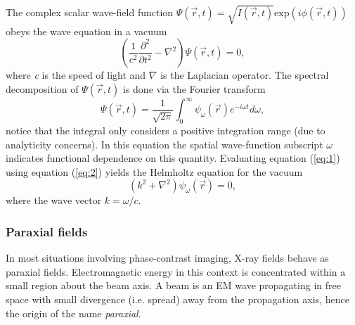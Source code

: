 \documentclass[9pt, a4paper]{article}
\begin{document}
The complex scalar wave-field function $\Psi(\vec{r},t) = \sqrt{I(\vec{r},t)} \mathrm{exp}(i \phi(\vec{r},t))$ obeys the wave equation in a vacuum
\begin{equation}\label{eq:1}
\left ( \frac{1}{c^2} \frac{\partial^2 }{\partial t^2} -\nabla^2 \right ) \Psi(\vec{r},t) = 0,
\end{equation} 
where \textit{c} is the speed of light and $\nabla$ is the Laplacian operator.
The spectral decomposition of $\Psi(\vec{r},t)$ is done via the Fourier transform
\begin{equation}\label{eq:2}
\Psi(\vec{r},t) = \frac{1}{\sqrt{2 \pi}} \int_{0}^{\infty}\psi_{\omega}(\vec{r}) e^{-i\omega t}d\omega,
\end{equation}
notice that the integral only considers a positive integration range (due to analyticity concerns\cite{PagsTutes}). In this equation the spatial wave-function subscript $\omega$ indicates functional dependence on this quantity\cite{Pags2006}. Evaluating equation (\ref{eq:1}) using equation (\ref{eq:2}) yields the Helmholtz equation for the vacuum
\begin{equation}\label{eq:6}
\left ( k^2 + \nabla^{2} \right ) \psi_{\omega}(\vec{r})  
 = 0,
\end{equation}
where the wave vector $k = \omega/c$.

\subsubsection{Paraxial fields}
In most situations involving phase-contrast imaging, X-ray fields behave as paraxial fields. Electromagnetic energy in this context is concentrated within a small region about the beam axis. A beam is an EM wave propagating in free space with small divergence (i.e. spread) away from the propagation axis, hence the origin of the name \textit{paraxial}.
\end{document}
